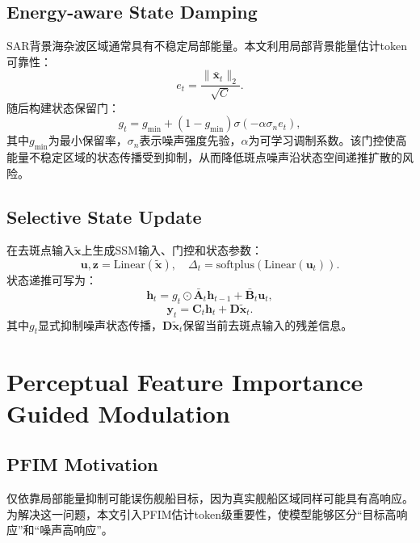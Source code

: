 \documentclass[UTF8,zihao=-4]{ctexart}
\begin{document}
\subsection{Energy-aware State Damping}

SAR背景海杂波区域通常具有不稳定局部能量。本文利用局部背景能量估计token可靠性：
\begin{equation}
  e_t = \frac{\|\bar{\mathbf{x}}_t\|_2}{\sqrt{C}} .
\end{equation}
随后构建状态保留门：
\begin{equation}
  g_t = g_{\min} + (1-g_{\min})\sigma(-\alpha \sigma_n e_t),
\end{equation}
其中$g_{\min}$为最小保留率，$\sigma_n$表示噪声强度先验，$\alpha$为可学习调制系数。该门控使高能量不稳定区域的状态传播受到抑制，从而降低斑点噪声沿状态空间递推扩散的风险。

\subsection{Selective State Update}

在去斑点输入$\widetilde{\mathbf{x}}$上生成SSM输入、门控和状态参数：
\begin{equation}
  \mathbf{u},\mathbf{z}=\mathrm{Linear}(\widetilde{\mathbf{x}}), \quad
  \Delta_t=\mathrm{softplus}(\mathrm{Linear}(\mathbf{u}_t)).
\end{equation}
状态递推可写为：
\begin{equation}
  \mathbf{h}_t = g_t \odot \bar{\mathbf{A}}_t \mathbf{h}_{t-1}
  + \bar{\mathbf{B}}_t \mathbf{u}_t,
\end{equation}
\begin{equation}
  \mathbf{y}_t = \mathbf{C}_t \mathbf{h}_t + \mathbf{D}\widetilde{\mathbf{x}}_t .
\end{equation}
其中$g_t$显式抑制噪声状态传播，$\mathbf{D}\widetilde{\mathbf{x}}_t$保留当前去斑点输入的残差信息。

\section{Perceptual Feature Importance Guided Modulation}

\subsection{PFIM Motivation}

仅依靠局部能量抑制可能误伤舰船目标，因为真实舰船区域同样可能具有高响应。为解决这一问题，本文引入PFIM估计token级重要性，使模型能够区分“目标高响应”和“噪声高响应”。
\end{document}
